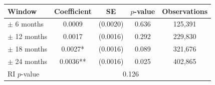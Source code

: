 \begin{tabular}{lcccc}
\toprule
Window & Coefficient & SE & $p$-value & Observations \\
\midrule
$\pm$ 6 months & 0.0009 & (0.0020) & 0.636 & 125,391 \\
$\pm$ 12 months & 0.0017 & (0.0016) & 0.292 & 229,830 \\
$\pm$ 18 months & 0.0027* & (0.0016) & 0.089 & 321,676 \\
$\pm$ 24 months & 0.0036** & (0.0016) & 0.025 & 402,865 \\
\midrule
RI $p$-value & \multicolumn{4}{c}{0.126} \\
\bottomrule
\end{tabular}
